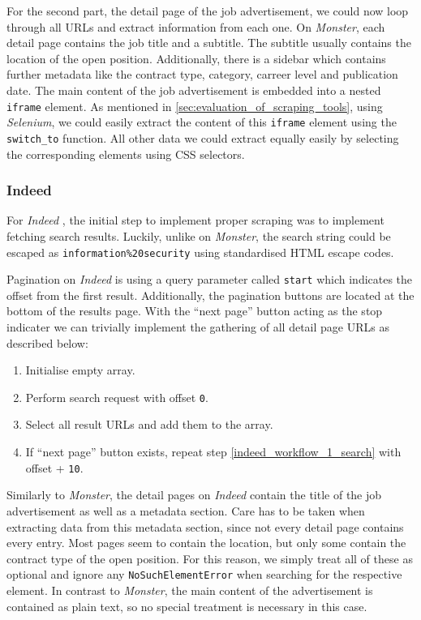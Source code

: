 \documentclass[runningheads]{llncs}
\begin{document}
For the second part, the detail page of the job advertisement, we could now loop through all URLs and extract information from each one. On \textit{Monster}, each detail page contains the job title and a subtitle. The subtitle usually contains the location of the open position. Additionally, there is a sidebar which contains further metadata like the contract type, category, carreer level and publication date. The main content of the job advertisement is embedded into a nested \texttt{iframe} element. As mentioned in \autoref{sec:evaluation_of_scraping_tools}, using \textit{Selenium}, we could easily extract the content of this \texttt{iframe} element using the \texttt{switch\_to} function. All other data we could extract equally easily by selecting the corresponding elements using CSS selectors.

\subsubsection{Indeed}
\label{subsub:indeed}

For \textit{Indeed} \cite{indeed}, the initial step to implement proper scraping was to implement fetching search results. Luckily, unlike on \textit{Monster}, the search string could be escaped as \texttt{information\%20security} using standardised HTML escape codes.

Pagination on \textit{Indeed} is using a query parameter called \texttt{start} which indicates the offset from the first result. Additionally, the pagination buttons are located at the bottom of the results page. With the “next page” button acting as the stop indicater we can trivially implement the gathering of all detail page URLs as described below:

\begin{enumerate}
  \item Initialise empty array.
  \item \label{indeed_workflow_1_search}
    Perform search request with offset \texttt{0}.
  \item Select all result URLs and add them to the array.
  \item If “next page” button exists, repeat step \ref{indeed_workflow_1_search} with offset + \texttt{10}.
\end{enumerate}

Similarly to \textit{Monster}, the detail pages on \textit{Indeed} contain the title of the job advertisement as well as a metadata section. Care has to be taken when extracting data from this metadata section, since not every detail page contains every entry. Most pages seem to contain the location, but only some contain the contract type of the open position. For this reason, we simply treat all of these as optional and ignore any \texttt{NoSuchElementError} when searching for the respective element. In contrast to \textit{Monster}, the main content of the advertisement is contained as plain text, so no special treatment is necessary in this case.
\end{document}
